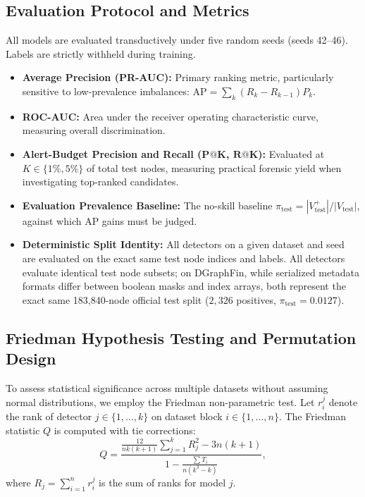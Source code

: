 \documentclass[11pt,a4paper]{article}
\begin{document}
\subsection{Evaluation Protocol and Metrics}
All models are evaluated transductively under five random seeds (seeds 42--46). Labels are strictly withheld during training.
\begin{itemize}
    \item \textbf{Average Precision (PR-AUC):} Primary ranking metric, particularly sensitive to low-prevalence imbalances: $\mathrm{AP} = \sum_k (R_k - R_{k-1}) P_k$.
    \item \textbf{ROC-AUC:} Area under the receiver operating characteristic curve, measuring overall discrimination.
    \item \textbf{Alert-Budget Precision and Recall ($\mathbf{P@K}$, $\mathbf{R@K}$):} Evaluated at $K \in \{1\%, 5\%\}$ of total test nodes, measuring practical forensic yield when investigating top-ranked candidates.
    \item \textbf{Evaluation Prevalence Baseline:} The no-skill baseline $\pi_{\mathrm{test}} = |V_{\mathrm{test}}^+| / |V_{\mathrm{test}}|$, against which AP gains must be judged.
    \item \textbf{Deterministic Split Identity:} All detectors on a given dataset and seed are evaluated on the exact same test node indices and labels. All detectors evaluate identical test node subsets; on DGraphFin, while serialized metadata formats differ between boolean masks and index arrays, both represent the exact same 183,840-node official test split ($2{,}326$ positives, $\pi_{\mathrm{test}} = 0.0127$).
\end{itemize}

\subsection{Friedman Hypothesis Testing and Permutation Design}
To assess statistical significance across multiple datasets without assuming normal distributions, we employ the Friedman non-parametric test. Let $r_i^j$ denote the rank of detector $j \in \{1, \dots, k\}$ on dataset block $i \in \{1, \dots, n\}$. The Friedman statistic $Q$ is computed with tie corrections:
\begin{equation}
Q = \frac{\frac{12}{n k (k+1)} \sum_{j=1}^k R_j^2 - 3 n (k+1)}{1 - \frac{\sum T_i}{n(k^3 - k)}},
\label{eq:friedman_q}
\end{equation}
where $R_j = \sum_{i=1}^n r_i^j$ is the sum of ranks for model $j$. 
\end{document}
